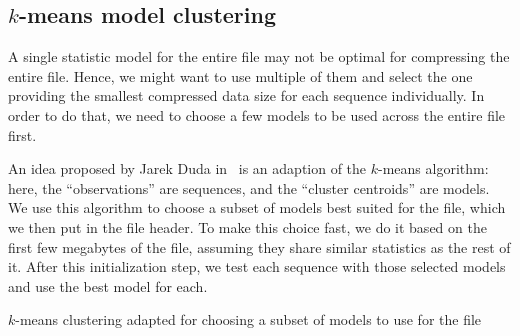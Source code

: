 \subsection{$k$-means model clustering}\label{subsec:$k$-means-model-clustering}

A single statistic model for the entire file may not be optimal for
compressing the entire file.
Hence, we might want to use multiple of them and select the one providing the
smallest compressed data size for each sequence individually.
In order to do that, we need to choose a few models to be used across the
entire file first.

An idea proposed by Jarek Duda in~\cite{https://doi.org/10.48550/arxiv.2201.05028} is an adaption of the
$k$-means algorithm: here,
the ``observations'' are sequences, and the ``cluster centroids'' are models.
We use this algorithm to choose a subset of models best suited for the file,
which we then put in the file header.
To make this choice fast, we do it based on the first few megabytes of the
file, assuming they share similar statistics as the rest of it.
After this initialization step, we test each sequence with those selected
models and use the best model for each.

\begin{algorithm}[H]
    \caption{$k$-means clustering adapted for choosing a subset of models to
    use for the file}%
    \label{alg:kmeans}%
    \begin{algorithmic}%
            \State{}%
            \State{}%
            \State{}%
            \Repeat
                \EndFor
        \EndProcedure%
    \end{algorithmic}%
\end{algorithm}

